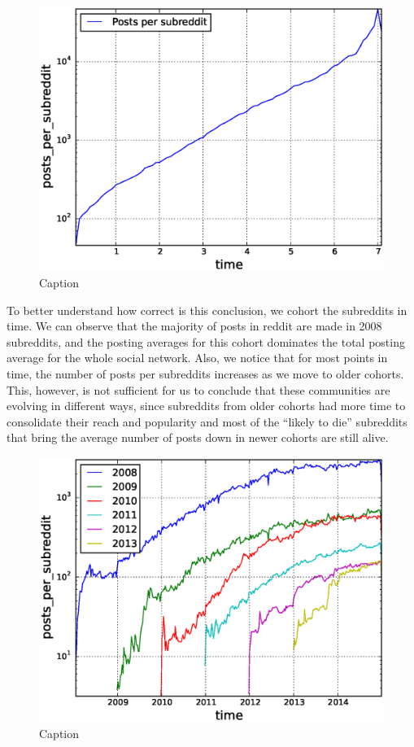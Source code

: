 \begin{figure}[!tb]
\centering
\includegraphics[scale=0.4]{./images/posts_per_subreddit_sub_ref_total.eps}
\caption{Caption}
\label{fig:posts_per_subreddit_sub_ref_total}
\end{figure}

To better understand how correct is this conclusion, we cohort the subreddits in time. We can observe that the majority of posts in reddit are made in 2008 subreddits, and the posting averages for this cohort dominates the total posting average for the whole social network. Also, we notice that for most points in time, the number of posts per subreddits increases as we move to older cohorts. This, however, is not sufficient for us to conclude that these communities are evolving in different ways, since subreddits from older cohorts had more time to consolidate their reach and popularity and most of the ``likely to die'' subreddits that bring the average number of posts down in newer cohorts are still alive.

\begin{figure}[!tb]
\centering
\includegraphics[scale=0.4]{./images/posts_per_subreddit_over_time_cohorts.eps}
\caption{Caption}
\label{fig:posts_per_subreddit_over_time_cohorts}
\end{figure}

